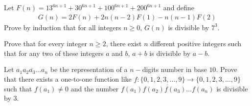 \begin{problem}
	Let $F(n) = 13^{6n+1} + 30^{6n+1} + 100^{6n+1} + 200^{6n+1}$ and define
		\begin{align*}
			G(n) = 2F(n) + 2n(n - 2)F(1) - n(n - 1)F(2)
		\end{align*}
	Prove by induction that for all integers $n \geq 0$, $G(n)$ is divisible by $7^3$. %
\end{problem}

\begin{problem}
	Prove that for every integer $n \geq 2$, there exist $n$ different positive integers such that for any two of these integers $a$ and $b$, $a+b$ is divisible by $a - b.$ %
\end{problem}

%

\begin{problem}
	Let $\overline{a_1a_2a_3\ldots a_n}$ be the representation of a $n-$digits number in base $10.$ Prove that there exists a one-to-one function like $f : \{0, 1, 2, 3, \ldots, 9\} \to \{0, 1, 2, 3, \ldots, 9\}$ such that $f(a_1) \neq 0$ and the number $\overline{ f(a_1)f(a_2)f(a_3) \ldots f(a_n) }$ is divisible by $3.$ %
\end{problem}


